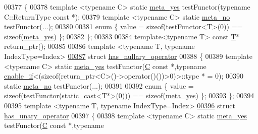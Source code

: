 \begin{DoxyCode}
00377 \{
00378   \textcolor{keyword}{template} <\textcolor{keyword}{typename} C> \textcolor{keyword}{static} \hyperlink{struct_eigen_1_1internal_1_1meta__yes}{meta\_yes} testFunctor(\textcolor{keyword}{typename} C::ReturnType \textcolor{keyword}{const} *);
00379   \textcolor{keyword}{template} <\textcolor{keyword}{typename} C> \textcolor{keyword}{static} \hyperlink{struct_eigen_1_1internal_1_1meta__no}{meta\_no} testFunctor(...);
00380 
00381   \textcolor{keyword}{enum} \{ value = \textcolor{keyword}{sizeof}(testFunctor<T>(0)) == \textcolor{keyword}{sizeof}(\hyperlink{struct_eigen_1_1internal_1_1meta__yes}{meta\_yes}) \};
00382 \};
00383 
00384 \textcolor{keyword}{template}<\textcolor{keyword}{typename} T> \textcolor{keyword}{const} \hyperlink{group___sparse_core___module}{T}* return\_ptr();
00385 
00386 \textcolor{keyword}{template} <\textcolor{keyword}{typename} T, \textcolor{keyword}{typename} IndexType=Index>
\hyperlink{struct_eigen_1_1internal_1_1has__nullary__operator}{00387} \textcolor{keyword}{struct }\hyperlink{struct_eigen_1_1internal_1_1has__nullary__operator}{has\_nullary\_operator}
00388 \{
00389   \textcolor{keyword}{template} <\textcolor{keyword}{typename} C> \textcolor{keyword}{static} \hyperlink{struct_eigen_1_1internal_1_1meta__yes}{meta\_yes} testFunctor(\hyperlink{group___core___module}{C} \textcolor{keyword}{const} *,\textcolor{keyword}{typename} 
      \hyperlink{struct_eigen_1_1internal_1_1enable__if}{enable\_if}<(\textcolor{keyword}{sizeof}(return\_ptr<C>()->\textcolor{keyword}{operator}()())>0)>::type * = 0);
00390   \textcolor{keyword}{static} \hyperlink{struct_eigen_1_1internal_1_1meta__no}{meta\_no} testFunctor(...);
00391 
00392   \textcolor{keyword}{enum} \{ value = \textcolor{keyword}{sizeof}(testFunctor(static\_cast<T*>(0))) == \textcolor{keyword}{sizeof}(\hyperlink{struct_eigen_1_1internal_1_1meta__yes}{meta\_yes}) \};
00393 \};
00394 
00395 \textcolor{keyword}{template} <\textcolor{keyword}{typename} T, \textcolor{keyword}{typename} IndexType=Index>
\hyperlink{struct_eigen_1_1internal_1_1has__unary__operator}{00396} \textcolor{keyword}{struct }\hyperlink{struct_eigen_1_1internal_1_1has__unary__operator}{has\_unary\_operator}
00397 \{
00398   \textcolor{keyword}{template} <\textcolor{keyword}{typename} C> \textcolor{keyword}{static} \hyperlink{struct_eigen_1_1internal_1_1meta__yes}{meta\_yes} testFunctor(\hyperlink{group___core___module}{C} \textcolor{keyword}{const} *,\textcolor{keyword}{typename} 

\end{DoxyCode}
